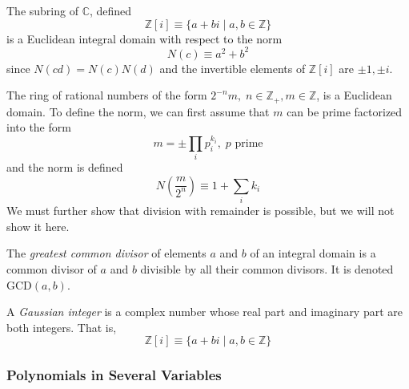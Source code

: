 \documentclass{article}
\begin{document}
      \begin{example}
        The subring of $\mathbb{C}$, defined
        \begin{equation}
          \mathbb{Z}[i] \equiv \{ a + b i \; | \; a, b \in \mathbb{Z} \}
        \end{equation}
        is a Euclidean integral domain with respect to the norm 
        \begin{equation}
          N(c) \equiv a^2 + b^2
        \end{equation}
        since $N(c d) = N(c) N(d)$ and the invertible elements of $\mathbb{Z}[i]$ are $\pm 1, \pm i$. 
      \end{example}

      \begin{example}
        The ring of rational numbers of the form $2^{-n} m, \; n \in \mathbb{Z}_+, m \in \mathbb{Z}$, is a Euclidean domain. To define the norm, we can first assume that $m$ can be prime factorized into the form 
        \begin{equation}
          m = \pm \prod_{i} p_{i}^{k_i}, \; p \text{ prime}
        \end{equation}
        and the norm is defined 
        \begin{equation}
          N(\frac{m}{2^n}) \equiv 1 + \sum_i k_i
        \end{equation}
        We must further show that division with remainder is possible, but we will not show it here. 
      \end{example}

      \begin{definition}
        The \textit{greatest common divisor} of elements $a$ and $b$ of an integral domain is a common divisor of $a$ and $b$ divisible by all their common divisors. It is denoted GCD$(a, b)$. 
      \end{definition}

      \begin{definition}
        A \textit{Gaussian integer} is a complex number whose real part and imaginary part are both integers. That is, 
        \begin{equation}
          \mathbb{Z}[i] \equiv \{a + b i \;|\; a, b \in \mathbb{Z} \}
        \end{equation}
      \end{definition}

    \subsubsection{Polynomials in Several Variables}
\end{document}

